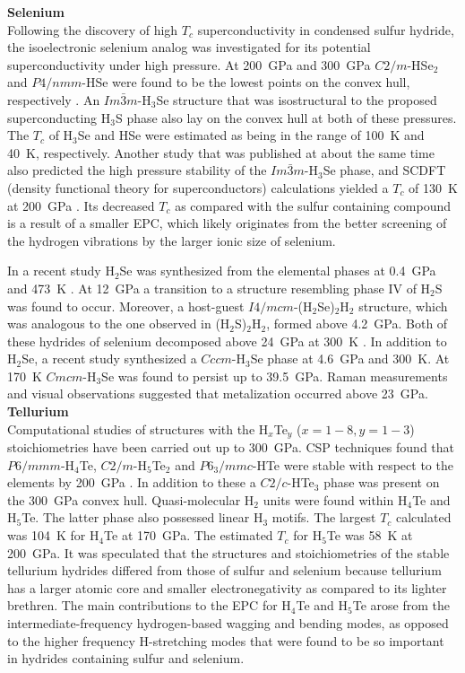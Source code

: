 \documentclass[12pt,letterpaper,oneside]{article}
\begin{document}
\noindent\textbf{Selenium} \\ 
%
Following the discovery of high $T_{c}$ superconductivity in condensed sulfur hydride, the isoelectronic selenium analog was investigated for its potential superconductivity under high pressure. At 200~GPa and 300~GPa $C2/m$-HSe$_2$ and $P4/nmm$-HSe were found to be the lowest points on the convex hull, respectively \cite{Zhang:2015b}. An $Im\bar{3}m$-H$_3$Se structure that was isostructural to the proposed superconducting H$_3$S phase also lay on the convex hull at both of these pressures. The $T_c$ of H$_3$Se and HSe were estimated as being in the range of 100~K and 40~K, respectively. Another study that was published at about the same time also predicted the high pressure stability of the $Im\bar{3}m$-H$_3$Se phase, and SCDFT (density functional theory for superconductors) calculations yielded a $T_c$ of 130~K at 200~GPa \cite{Flores:2016a}. Its decreased $T_c$ as compared with the sulfur containing compound is a result of a smaller EPC, which likely originates from the better screening of the hydrogen vibrations by the larger ionic size of selenium. 

In a recent study H$_2$Se was synthesized from the elemental phases at 0.4~GPa and 473~K \cite{Pace:2017a}. At 12~GPa a transition to a structure resembling phase IV of H$_2$S was found to occur. Moreover, a host-guest $I4/mcm$-(H$_2$Se)$_2$H$_2$ structure, which was analogous to the one observed in (H$_2$S)$_2$H$_2$, formed above 4.2~GPa. Both of these hydrides of selenium decomposed above 24~GPa at 300~K \cite{Zhang:2018-Se}. In addition to H$_2$Se, a recent study synthesized a $Cccm$-H$_3$Se phase at 4.6~GPa and 300~K. At 170~K $Cmcm$-H$_3$Se was found to persist up to 39.5~GPa. Raman measurements and visual observations suggested that metalization occurred above 23~GPa. \\


\noindent\textbf{Tellurium} \\ 
%
Computational studies of structures with the H$_x$Te$_y$ ($x=1-8, y=1-3$) stoichiometries have been carried out up to 300~GPa. CSP techniques found that $P6/mmm$-H$_4$Te, $C2/m$-H$_5$Te$_2$ and $P6_3/mmc$-HTe were stable with respect to the elements by 200~GPa \cite{Zhong:2016}. In addition to these a $C2/c$-HTe$_3$ phase was present on the 300~GPa convex hull. Quasi-molecular H$_2$ units were found within H$_4$Te and H$_5$Te. The latter phase also possessed linear H$_3$ motifs. The largest $T_c$ calculated was 104~K for H$_4$Te at 170~GPa. The estimated $T_c$ for H$_5$Te was 58~K at 200~GPa. It was speculated that the structures and stoichiometries of the stable tellurium hydrides differed from those of sulfur and selenium because tellurium has a larger atomic core and smaller electronegativity as compared to its lighter brethren. The main contributions to the EPC for H$_4$Te and H$_5$Te arose from the intermediate-frequency hydrogen-based wagging and bending modes, as opposed to the higher frequency H-stretching modes that were found to be so important in hydrides containing sulfur and selenium.\\ 
\end{document}
